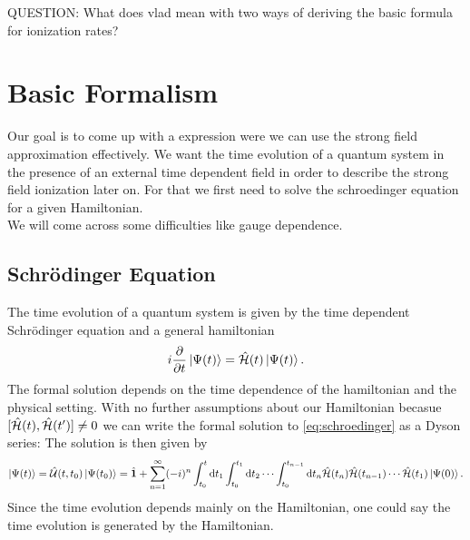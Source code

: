 QUESTION: What does vlad mean with two ways of deriving the basic formula for ionization rates?


\newpage
\section{Basic Formalism}
Our goal is to come up with a expression were we can use the strong field approximation effectively.
We want the time evolution of a quantum system in the presence of an external time dependent field in order to describe the strong field ionization later on.
For that we first need to solve the schroedinger equation for a given Hamiltonian.\\
We will come across some difficulties like gauge dependence.

\subsection{Schrödinger Equation}
The time evolution of a quantum system is given by the time dependent Schrödinger equation and a general hamiltonian
\begin{equation}
    i \frac{\partial}{\partial t} \ket{\Psi(t)} = \hat{\mathcal{H}}(t) \ket{\Psi(t)}. \label{eq:schroedinger}
\end{equation}
The formal solution depends on the time dependence of the hamiltonian and the physical setting. 
With no further assumptions about our Hamiltonian becasue $[\hat{\mathcal{H}}(t), \hat{\mathcal{H}}(t')] \neq 0$ we can write the formal solution to \eqref{eq:schroedinger} as a Dyson series:
The solution is then given by 
\begin{equation}
    \ket{\Psi(t)} = \hat{\mathcal{U}}(t,t_0)\ket{\Psi(t_0)} = \hat{\mathbf{1}} + \sum_{n=1}^{\infty} (-i)^n \int_{t_0}^{t} \mathrm{d} t_1 \int_{t_0}^{t_1} \mathrm{d} t_2 \cdots \int_{t_0}^{t_{n-1}} \mathrm{d} t_n \hat{\mathcal{H}}(t_n) \hat{\mathcal{H}}(t_{n-1})\cdots\hat{\mathcal{H}}(t_1) \ket{\Psi(0)}. \label{eq:dyson}
\end{equation}
Since the time evolution depends mainly on the Hamiltonian, one could say the time evolution is generated by the Hamiltonian.





